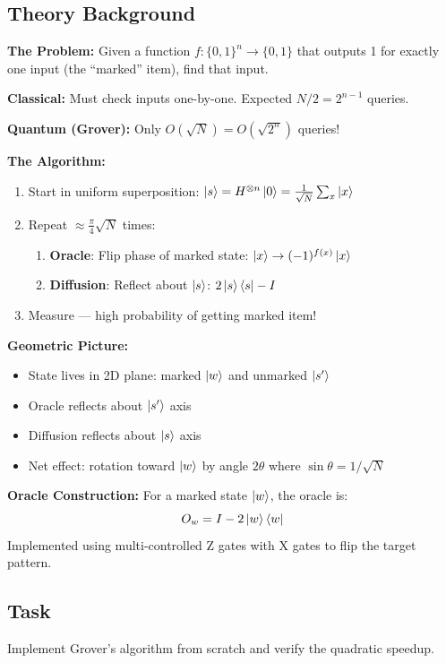 \documentclass[11pt,a4paper]{article}
\begin{document}
\subsection*{Theory Background}
\textbf{The Problem:} Given a function $f: \{0,1\}^n \to \{0,1\}$ that outputs 1 for exactly one input (the ``marked'' item), find that input.

\textbf{Classical:} Must check inputs one-by-one. Expected $N/2 = 2^{n-1}$ queries.

\textbf{Quantum (Grover):} Only $O(\sqrt{N}) = O(\sqrt{2^n})$ queries!

\textbf{The Algorithm:}
\begin{enumerate}
    \item Start in uniform superposition: $\ket{s} = H^{\otimes n}\ket{0} = \frac{1}{\sqrt{N}}\sum_x \ket{x}$
    \item Repeat $\approx \frac{\pi}{4}\sqrt{N}$ times:
    \begin{enumerate}[label=(\alph*)]
        \item \textbf{Oracle}: Flip phase of marked state: $\ket{x} \to (-1)^{f(x)}\ket{x}$
        \item \textbf{Diffusion}: Reflect about $\ket{s}$: $2\ket{s}\bra{s} - I$
    \end{enumerate}
    \item Measure --- high probability of getting marked item!
\end{enumerate}

\textbf{Geometric Picture:}
\begin{itemize}
    \item State lives in 2D plane: marked $\ket{w}$ and unmarked $\ket{s'}$
    \item Oracle reflects about $\ket{s'}$ axis
    \item Diffusion reflects about $\ket{s}$ axis
    \item Net effect: rotation toward $\ket{w}$ by angle $2\theta$ where $\sin\theta = 1/\sqrt{N}$
\end{itemize}

\textbf{Oracle Construction:}
For a marked state $\ket{w}$, the oracle is:
\[
O_w = I - 2\ket{w}\bra{w}
\]
Implemented using multi-controlled Z gates with X gates to flip the target pattern.

\subsection*{Task}
Implement Grover's algorithm from scratch and verify the quadratic speedup.
\end{document}

